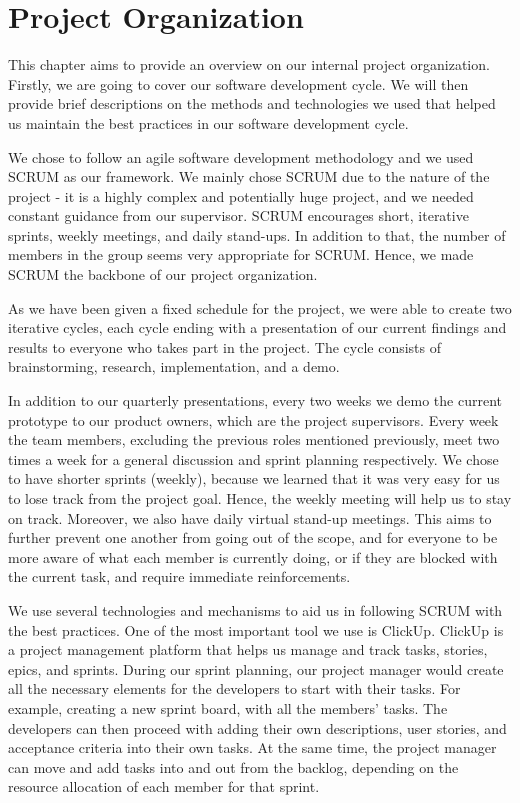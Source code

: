 \section{Project Organization}

This chapter aims to provide an overview on our internal project organization. Firstly, we are going to cover our software development cycle. We will then provide brief descriptions on the methods and technologies we used that helped us maintain the best practices in our software development cycle. 

We chose to follow an agile software development methodology and we used SCRUM as our framework. We mainly chose SCRUM due to the nature of the project - it is a highly complex and potentially huge project, and we needed constant guidance from our supervisor. SCRUM encourages short, iterative sprints, weekly meetings, and daily stand-ups. In addition to that, the number of members in the group seems very appropriate for SCRUM. Hence, we made SCRUM the backbone of our project organization. 

As we have been given a fixed schedule for the project, we were able to create two iterative cycles, each cycle ending with a presentation of our current findings and results to everyone who takes part in the project. The cycle consists of brainstorming, research, implementation, and a demo. 

In addition to our quarterly presentations, every two weeks we demo the current prototype to our product owners, which are the project supervisors. Every week the team members, excluding the previous roles mentioned previously, meet two times a week for a general discussion and sprint planning respectively. We chose to have shorter sprints (weekly), because we learned that it was very easy for us to lose track from the project goal. Hence, the weekly meeting will help us to stay on track. Moreover, we also have daily virtual stand-up meetings. This aims to further prevent one another from going out of the scope, and for everyone to be more aware of what each member is currently doing, or if they are blocked with the current task, and require immediate reinforcements. 

We use several technologies and mechanisms to aid us in following SCRUM with the best practices. One of the most important tool we use is ClickUp. ClickUp is a project management platform that helps us manage and track tasks, stories, epics, and sprints. During our sprint planning, our project manager would create all the necessary elements for the developers to start with their tasks. For example, creating a new sprint board, with all the members' tasks. The developers can then proceed with adding their own descriptions, user stories, and acceptance criteria into their own tasks. At the same time, the project manager can move and add tasks into and out from the backlog, depending on the resource allocation of each member for that sprint. 

